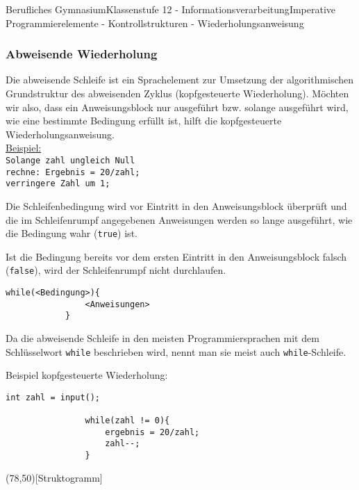 \documentclass[11pt,oneside,openany,headings=optiontotoc,11pt,numbers=noenddot]{article}
\begin{document}
\begin{worksheet}{Berufliches Gymnasium}{Klassenstufe 12 - Informationsverarbeitung}{Imperative Programmierelemente - Kontrollstrukturen - Wiederholungsanweisung}
		\subsubsection{Abweisende Wiederholung}
		\label{abwei}
		Die abweisende Schleife ist ein Sprachelement zur Umsetzung der algorithmischen Grundstruktur des abweisenden Zyklus (kopfgesteuerte Wiederholung). Möchten wir also, dass ein Anweisungsblock nur ausgeführt bzw. solange ausgeführt wird, wie eine bestimmte Bedingung erfüllt ist, hilft die kopfgesteuerte Wiederholungsanweisung.\\
		\underline{Beispiel:}\\
		\texttt{\indent{}Solange zahl ungleich Null\\
		\indent{}\indent{}rechne: Ergebnis = 20/zahl;\\
		\indent{}\indent{}verringere Zahl um 1;}\\
		\par\noindent
		Die Schleifenbedingung wird vor Eintritt in den Anweisungsblock überprüft und die im Schleifenrumpf angegebenen Anweisungen werden so lange ausgeführt, wie die Bedingung wahr (\lstinline[style=JavaInputStyle]{true}) ist.\\
		\par\noindent
		Ist die Bedingung bereits vor dem ersten Eintritt in den Anweisungsblock falsch (\lstinline[style=JavaInputStyle]{false}), wird der Schleifenrumpf nicht durchlaufen.\\
		\begin{lstlisting}[style=JavaInputStyle]
			while(<Bedingung>){
				<Anweisungen>
			}
		\end{lstlisting}
		\par\bigskip\noindent
		Da die abweisende Schleife in den meisten Programmiersprachen mit dem Schlüsselwort \lstinline[style=JavaInputStyle]{while} beschrieben wird, nennt man sie meist auch \lstinline[style=JavaInputStyle]{while}-Schleife.\\
		\par\noindent
		\begin{minipage}[t]{0.48\textwidth}
			\vspace*{0pt}
			Beispiel kopfgesteuerte Wiederholung:
			\begin{lstlisting}[style=JavaInputStyle,frame=single]
				int zahl = input();
				
				while(zahl != 0){
					ergebnis = 20/zahl;
					zahl--;
				}
			\end{lstlisting}
		\end{minipage}
		\hfill
		\begin{minipage}[t]{0.48\textwidth}
			\vspace*{0pt}
			\begin{struktogramm}(78,50)[Struktogramm]
				\whileend
			\end{struktogramm}
		\end{minipage}

\end{worksheet}
\end{document}

